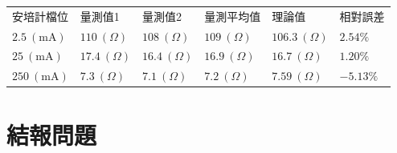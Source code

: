 \documentclass[12pt, a4paper]{article}
\newcommand{\unit}[1]{\:(\text{#1})}
\begin{document}
\begin{center}
	\begin{tabular}{p{2.5cm}p{2cm}p{2cm}p{2.5cm}p{2.5cm}p{2cm}}
	\hline
	安培計檔位 & 量測值1 & 量測值2 & 量測平均值 & 理論值 & 相對誤差 \\
	\hhline{======}
	$2.5\unit{mA}$ & $110 \:(\Omega)$ & $108 \:(\Omega)$ & $109 \:(\Omega)$ & $106.3 \:(\Omega) $ & $2.54\%$ \\
	\hline
	$25\unit{mA}$ & $17.4 \:(\Omega)$ & $16.4 \:(\Omega)$ & $16.9 \:(\Omega)$ & $16.7 \:(\Omega) $ & $1.20\%$ \\
	\hline
	$250\unit{mA}$ & $7.3 \:(\Omega)$ & $7.1 \:(\Omega)$ & $7.2 \:(\Omega)$ & $7.59 \:(\Omega) $ & $-5.13\%$ \\
	\hline
\end{tabular}
\end{center}


\section{結報問題}
\end{document}
